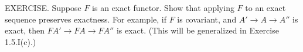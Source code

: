 EXERCISE. Suppose $F$ is an exact functor. Show that applying $F$ to an exact sequence preserves exactness. For example, if $F$ is covariant, and $A'\to A\to A''$ is exact, then $FA'\to FA\to FA''$ is exact. (This will be generalized in Exercise 1.5.I(c).)
